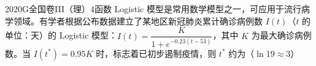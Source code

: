 
\begin{problem}{2020}{G}{全国卷III（理）}{4}{函数}
Logistic 模型是常用数学模型之一，可应用于流行病学领域。有学者根据公布数据建立了某地区新冠肺炎累计确诊病例数 $ I(t) $（$ t $ 的单位：天）的 Logistic 模型：$ I(t) = \dfrac{K}{1 + e^{-0.23(t - 53)}} $，其中 $ K $ 为最大确诊病例数。当 $ I(t^*) = 0.95K $ 时，标志着已初步遏制疫情，则 $ t^* $ 约为（$ \ln 19 \approx 3 $）
\begin{choices}
\end{choices}
\end{problem}

\begin{answer}

\end{answer}

\begin{solutions}

\end{solutions}
